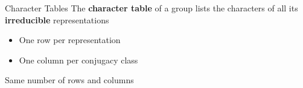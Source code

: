 \begin{frame}{Character Tables}
    \large
    The \textbf{character table} of a group lists the characters of all its \textbf{irreducible} representations
    
    \pause
    \vspace{1em}
    \begin{itemize}
        \item One row per representation \pause
        \item One column per conjugacy class
    \end{itemize}
    
    \vspace{1em}
    \pause
    Same number of rows and columns

    \vspace{1em}
    \normalsize
    {\hspace*{\fill} \cite{fulton2013}}

\end{frame}

